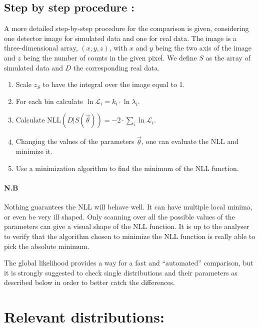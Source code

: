 \documentclass{article}
\newcommand{\Ell}{\ensuremath{\mathcal{L}}\xspace}
\begin{document}
\subsection{Step by step procedure :}\label{step-by-step-procedure}
A more detailed step-by-step procedure for the comparison is given, considering one detector image for simulated data and one for real data.
The image is a three-dimensional array, $(x,y,z)$, with $x$ and $y$ being the two axis of the image and $z$ being the number of counts in the given pixel.
We define $S$ as the array of simulated data and $D$ the corresponding real data.
\begin{enumerate}

\item Scale $z_S$ to have the integral over the image equal to 1.
\item For each bin calculate $\ln{\Ell_i} = k_i \cdot \ln{\lambda_i}$.
\item Calculate $\text{NLL}(D|S(\vec\theta)) = -2 \cdot \sum_i \ln{\Ell_i}$.
\item Changing the values of the parameters $\vec\theta$, one can evaluate the NLL and minimize it.
\item Use a minimization algorithm to find the minimum of the NLL function.
\end{enumerate}


\paragraph{N.B}
Nothing guarantees the NLL will behave well. It can have multiple local minima, or even be very ill shaped. Only scanning over all the possible values of the parameters can give a visual shape of the NLL function. It is up to the analyser to verify that the algorithm chosen to minimize the NLL function is really able to pick the absolute minimum.

The global likelihood provides a way for a fast and ``automated''
comparison, but it is strongly suggested to check single distributions
and their parameters as described below in order to better
catch the differences.

\section{Relevant distributions:}\label{relevant-distributions}
\end{document}
